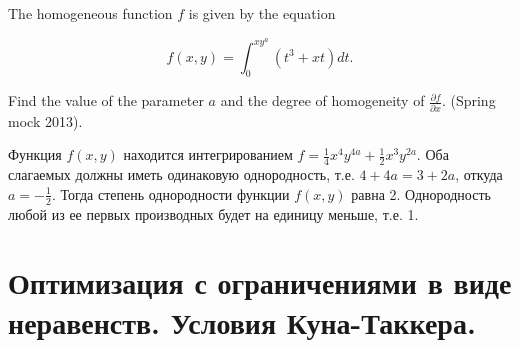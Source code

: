 \begin{problem}
The homogeneous function $f$ is given by the equation

\[
f(x,y)=\int _{0}^{xy^{a} }(t^{3} +xt)dt .
\]


Find the value of the parameter $a$ and the degree of homogeneity of $\frac{\partial f}{\partial x} $. (Spring mock 2013).



\begin{sol}
Функция $f(x,y)$ находится интегрированием $f=\frac{1}{4} x^{4} y^{4a} +\frac{1}{2} x^{3} y^{2a} $. Оба слагаемых должны иметь одинаковую однородность, т.е. $4+4a=3+2a$, откуда $a=-\frac{1}{2} $. Тогда степень однородности функции $f(x,y)$ равна 2. Однородность любой из ее первых производных будет на единицу меньше, т.е. 1.
\end{sol}
\end{problem}




\section{Оптимизация с ограничениями в виде неравенств. Условия Куна-Таккера.}

